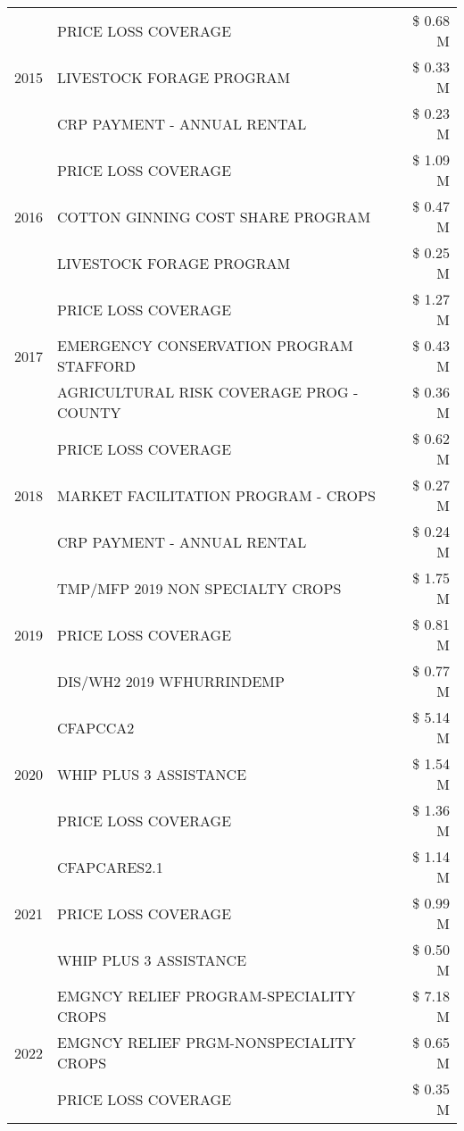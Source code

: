 \begin{tabular}{llr}
\cline{1-3}
\multirow[t]{3}{*}{2015} & PRICE LOSS COVERAGE & \$ 0.68 M \\
 & LIVESTOCK FORAGE PROGRAM & \$ 0.33 M \\
 & CRP PAYMENT - ANNUAL RENTAL & \$ 0.23 M \\
\cline{1-3}
\multirow[t]{3}{*}{2016} & PRICE LOSS COVERAGE & \$ 1.09 M \\
 & COTTON GINNING COST SHARE PROGRAM & \$ 0.47 M \\
 & LIVESTOCK FORAGE PROGRAM & \$ 0.25 M \\
\cline{1-3}
\multirow[t]{3}{*}{2017} & PRICE LOSS COVERAGE & \$ 1.27 M \\
 & EMERGENCY CONSERVATION PROGRAM STAFFORD & \$ 0.43 M \\
 & AGRICULTURAL RISK COVERAGE PROG - COUNTY & \$ 0.36 M \\
\cline{1-3}
\multirow[t]{3}{*}{2018} & PRICE LOSS COVERAGE & \$ 0.62 M \\
 & MARKET FACILITATION PROGRAM - CROPS & \$ 0.27 M \\
 & CRP PAYMENT - ANNUAL RENTAL & \$ 0.24 M \\
\cline{1-3}
\multirow[t]{3}{*}{2019} & TMP/MFP 2019 NON SPECIALTY CROPS & \$ 1.75 M \\
 & PRICE LOSS COVERAGE & \$ 0.81 M \\
 & DIS/WH2 2019 WFHURRINDEMP & \$ 0.77 M \\
\cline{1-3}
\multirow[t]{3}{*}{2020} & CFAPCCA2 & \$ 5.14 M \\
 & WHIP PLUS 3 ASSISTANCE & \$ 1.54 M \\
 & PRICE LOSS COVERAGE & \$ 1.36 M \\
\cline{1-3}
\multirow[t]{3}{*}{2021} & CFAPCARES2.1 & \$ 1.14 M \\
 & PRICE LOSS COVERAGE & \$ 0.99 M \\
 & WHIP PLUS 3 ASSISTANCE & \$ 0.50 M \\
\cline{1-3}
\multirow[t]{3}{*}{2022} & EMGNCY RELIEF PROGRAM-SPECIALITY CROPS & \$ 7.18 M \\
 & EMGNCY RELIEF PRGM-NONSPECIALITY CROPS & \$ 0.65 M \\
 & PRICE LOSS COVERAGE & \$ 0.35 M \\
\cline{1-3}
\bottomrule
\end{tabular}
